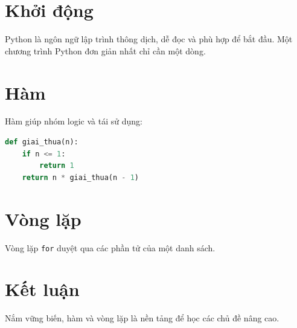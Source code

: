 \section{Khởi động}

Python là ngôn ngữ lập trình thông dịch, dễ đọc và phù hợp để bắt đầu.
Một chương trình Python đơn giản nhất chỉ cần một dòng.

\section{Hàm}

Hàm giúp nhóm logic và tái sử dụng:

\begin{lstlisting}[language=Python]
def giai_thua(n):
    if n <= 1:
        return 1
    return n * giai_thua(n - 1)
\end{lstlisting}

\section{Vòng lặp}

Vòng lặp \texttt{for} duyệt qua các phần tử của một danh sách.

\section{Kết luận}

Nắm vững biến, hàm và vòng lặp là nền tảng để học các chủ đề nâng cao.
